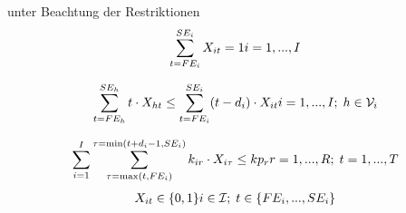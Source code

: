 \documentclass[a4paper,12pt,parskip,bibtotoc,liststotoc]{article}
\begin{document}
unter Beachtung der Restriktionen
\begin{multline} \label{N1}
\sum_{t=FE_{i}}^{SE_{i}} X_{it} = 1
\hfill   i = 1,...,I
\end{multline}\vspace{-3.0ex}

\begin{multline} \label{N2}
\sum_{t=FE_{h}}^{SE_{h}}t \cdot X_{ht} \leq \sum_{t=FE_{i}}^{SE_{i}}(t - d_{i}) \cdot X_{it}
\hfill   i =1,...,I;\; h \in \mathcal{V}_{i}
\end{multline}\vspace{-3.0ex}

\begin{multline} \label{N3}
\sum_{i=1}^{I}\sum_{\tau=\max(t,FE_{i})}^{\tau=\min(t+d_i-1,SE_i)}k_ {ir} \cdot X_{i\tau} \leq kp_{r}
\hfill   r =1,...,R;\; t=1,...,T
\end{multline}\vspace{-3.0ex}
\begin{multline} \label{N4}
X_{it} \in \{0,1\}
\hfill   i \in \mathcal{I};\; t \in \{FE_{i},...,SE_{i}\}\end{multline}\vspace{-6.0ex}\\
\end{document}
